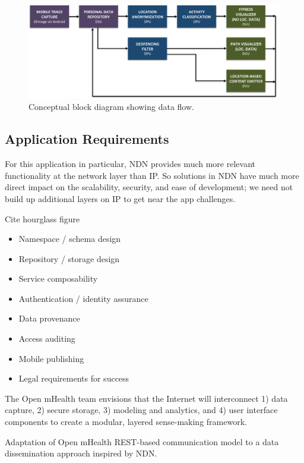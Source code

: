 \begin{figure}
\begin{center}
\includegraphics[width=1\textwidth]{figures/ConceptualBlock}
\caption{Conceptual block diagram showing data flow.}
\label{fig:ConceptualBlock}
\end{center}
\end{figure}



\subsection{Application Requirements}

For this application in particular, NDN provides much more relevant functionality at the network layer than IP.  
So solutions in NDN have much more direct impact on the scalability, security, and ease of development; we need not build up additional layers on IP to get near the app challenges.

Cite hourglass figure 

\begin{itemize}
\item Namespace / schema design
\item Repository / storage design
\item Service composability
\item Authentication / identity assurance
\item Data provenance
\item Access auditing
\item Mobile publishing
\item Legal requirements for success
\end{itemize}

The Open mHealth team envisions that the Internet will interconnect 1)
data capture, 2) secure storage, 3) modeling and analytics, and 4) user
interface components to create a modular, layered sense-making framework.  

Adaptation of Open mHealth REST-based communication model to a data dissemination approach inspired by NDN.

